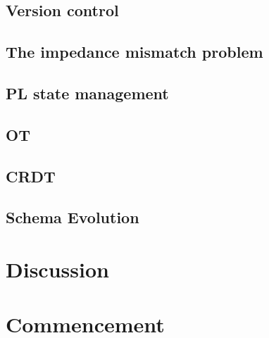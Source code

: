 \documentclass[english,submission]{programming}
\theoremstyle{definition}
\begin{document}
\subsection{Version control}\label{VC}




\subsection{The impedance mismatch problem} \label{impedance}


\subsection{PL state management}\label{PLstate}





\subsection{OT}\label{OT}

\subsection{CRDT}\label{CRDT}

\subsection{Schema Evolution}\label{schema}



\section{Discussion}




\section{Commencement}

\printbibliography
\end{document}
